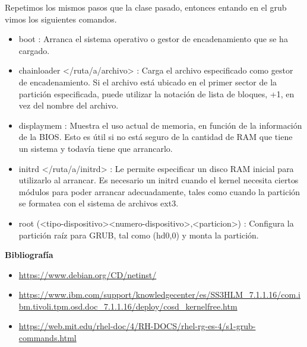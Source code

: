 \documentclass[11pt, a4paper]{report}
\begin{document}
Repetimos los mismos pasos que la clase pasado, entonces entando en el grub
vimos los siguientes comandos.

\begin{itemize}
\item boot : Arranca el sistema operativo o gestor de encadenamiento que se ha
  cargado.
\item chainloader </ruta/a/archivo> : Carga el archivo especificado como gestor
  de encadenamiento. Si el archivo está ubicado en el primer sector de la
  partición especificada, puede utilizar la notación de lista de bloques, +1,
  en vez del nombre del archivo.
\item displaymem : Muestra el uso actual de memoria, en función de la
  información de la BIOS. Esto es útil si no está seguro de la cantidad de RAM
  que tiene un sistema y todavía tiene que arrancarlo.
\item initrd </ruta/a/initrd> : Le permite especificar un disco RAM inicial
  para utilizarlo al arrancar. Es necesario un initrd cuando el kernel necesita
  ciertos módulos para poder arrancar adecuadamente, tales como cuando la
  partición se formatea con el sistema de archivos ext3.
\item root (<tipo-dispositivo><numero-dispositivo>,<particion>) : Configura la
  partición raíz para GRUB, tal como (hd0,0) y monta la partición.
\end{itemize}

\newpage

\textbf{Bibliografía} \\

\begin{itemize}

\item  \url{https://www.debian.org/CD/netinst/}
\item \url{https://www.ibm.com/support/knowledgecenter/es/SS3HLM_7.1.1.16/com.ibm.tivoli.tpm.osd.doc_7.1.1.16/deploy/cosd_kernelfree.htm}
\item \url{https://web.mit.edu/rhel-doc/4/RH-DOCS/rhel-rg-es-4/s1-grub-commands.html}
\end{itemize}
\end{document}
